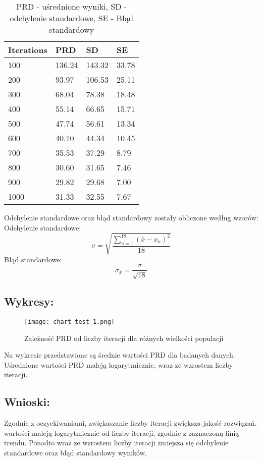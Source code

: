   \begin{table}[!ht]
    \centering
    \begin{tabular}{|l|l|l|l|}
    \hline
        Iterations & PRD & SD & SE \\ \hline
        100 & 136.24 & 143.32 & 33.78 \\ \hline
        200 & 93.97 & 106.53 & 25.11 \\ \hline
        300 & 68.04 & 78.38 & 18.48 \\ \hline
        400 & 55.14 & 66.65 & 15.71 \\ \hline
        500 & 47.74 & 56.61 & 13.34 \\ \hline
        600 & 40.10 & 44.34 & 10.45 \\ \hline
        700 & 35.53 & 37.29 & 8.79 \\ \hline
        800 & 30.60 & 31.65 & 7.46 \\ \hline
        900 & 29.82 & 29.68 & 7.00 \\ \hline
        1000 & 31.33 & 32.55 & 7.67 \\ \hline
    \end{tabular}
    \caption{PRD - uśrednione wyniki, SD - odchylenie standardowe, SE - Błąd standardowy}
  \end{table}

  Odchylenie standardowe oraz błąd standardowy zostały obliczone według wzorów: \\
    Odchylenie standardowe:
    \[ \sigma = \sqrt{\frac{\sum_{n = 1}^{18}(\bar{x} - x_n)^2}{18}} \]
    Błąd standardowe:
    \[ \sigma_{\bar{x}} = \frac{\sigma}{\sqrt{18}} \]

  \subsection{Wykresy: }
    \begin{figure}[H]
      \texttt{[image: chart\_test\_1.png]}
      \centering
      \caption{Zależność PRD od liczby iteracji dla różnych wielkości populacji}
    \end{figure}
  
  Na wykresie przedstawione są średnie wartości PRD dla badanych danych. Uśrednione wartości PRD maleją logarytmicznie, wraz ze wzrostem liczby iteracji.

  \subsection{Wnioski: }
  Zgodnie z oczyekiwaniami, zwiękaszanie liczby iteracji zwiększa jakość rozwiązań. wartości maleją logarytmicznie od liczby iteracji, zgodnie z zaznaczoną linią trendu. Ponadto wraz ze wzrostem liczby iteracji zmiejsza się odchylenie standardowe oraz błąd standardowy wyników.

